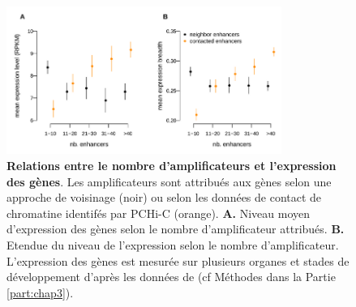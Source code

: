 \begin{figure}[h]
    \centering
    \includegraphics[width=0.8\textwidth, page=1]{figures/chap2/chap2-fig7.png}
    \caption[Relations entre le nombre d'amplificateurs et l'expression des gènes.]{
    \textbf{Relations entre le nombre d'amplificateurs et l'expression des gènes}. Les amplificateurs sont attribués aux gènes selon une approche de voisinage (noir) ou selon les données de contact de chromatine identifés par \gls{PCHi-C} (orange).
    \textbf{A.} Niveau moyen d'expression des gènes selon le nombre d'amplificateur attribués.
    \textbf{B.} Etendue du niveau de l'expression selon le nombre d'amplificateur.
    L'expression des gènes est mesurée sur plusieurs organes et stades de développement d'après les données de \citep{cardoso-moreira_gene_2019} (cf Méthodes dans la Partie \ref{part:chap3}).
    }
    \label{fig:chap2-fig7}
\end{figure} 

